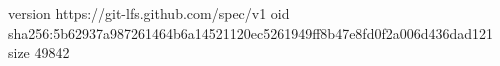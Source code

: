 version https://git-lfs.github.com/spec/v1
oid sha256:5b62937a987261464b6a14521120ec5261949ff8b47e8fd0f2a006d436dad121
size 49842
